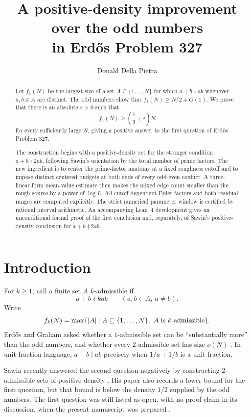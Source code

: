 \documentclass[11pt]{article}
\title{A positive-density improvement over the odd numbers\\
in Erd\H{o}s Problem 327}
\author{Donald Della Pietra}
\date{}
\begin{document}
\maketitle

\begin{abstract}
Let \(f_1(N)\) be the largest size of a set
\(A\subseteq\{1,\ldots,N\}\) for which
\(a+b\nmid ab\) whenever \(a,b\in A\) are distinct. The odd numbers show
that \(f_1(N)\geq N/2+O(1)\). We prove that there is an absolute
\(\varepsilon>0\) such that
\[
 f_1(N)\geq\left(\frac12+\varepsilon\right)N
\]
for every sufficiently large \(N\), giving a positive answer to the first
question of Erd\H{o}s Problem 327.

The construction begins with a positive-density set for the stronger
condition \(a+b\nmid2ab\), following Sawin's orientation by the total number
of prime factors. The new ingredient is to center the prime-factor anatomy
at a fixed roughness cutoff and to impose distinct centered budgets at both
ends of every odd-even conflict. A three-linear-form mean-value estimate then
makes the mixed edge count smaller than the rough source by a power of
\(\log L\). All cutoff-dependent Euler factors and both residual ranges are
computed explicitly. The strict numerical parameter window is certified by
rational interval arithmetic. An accompanying Lean~4 development gives an
unconditional formal proof of the first conclusion and, separately, of
Sawin's positive-density conclusion for \(a+b\nmid2ab\).
\end{abstract}

\section{Introduction}

For \(k\geq1\), call a finite set \(A\) \(k\)-admissible if
\[
 a+b\nmid kab
 \qquad(a,b\in A,\ a\ne b).
\]
Write
\[
 f_k(N)=\max\{\left|A\right|:A\subseteq\{1,\ldots,N\},\
 A\text{ is \(k\)-admissible}\}.
\]
Erd\H{o}s and Graham asked whether a \(1\)-admissible set can be
``substantially more'' than the odd numbers, and whether every
\(2\)-admissible set has size \(o(N)\)
\cite[p.~37]{ErdosGraham1980}. In unit-fraction language,
\(a+b\mid ab\) precisely when \(1/a+1/b\) is a unit fraction.

Sawin recently answered the second question negatively by constructing
\(2\)-admissible sets of positive density \cite{Sawin2026}. His paper also
records a lower bound for the first question, but that bound is below the
density \(1/2\) supplied by the odd numbers. The first question was still
listed as open, with no proof claim in its discussion, when the present
manuscript was prepared \cite{ErdosProblem327}.
\end{document}
